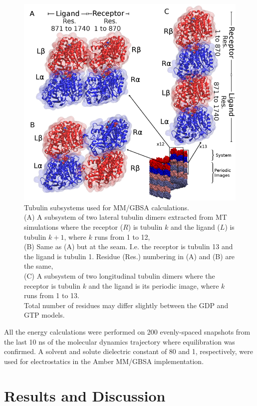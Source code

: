 \documentclass[11pt]{report}
\begin{document}
\begin{figure}[htbp]
	\centering
	\includegraphics[width=0.8\linewidth]{images/Fig3.pdf}
	\caption[Tubulin subsystems used for MM/GBSA Calculations]{{Tubulin subsystems used for MM/GBSA calculations.}
		\\
		(A) A subsystem of two lateral tubulin dimers extracted
		from MT simulations where the receptor ($R$) is tubulin $k$
		and the ligand ($L$) is  tubulin $k+1$, where $k$ runs from 1 to 12,
		\\
		(B) Same as (A) but at the seam. I.e. the receptor is tubulin 13 and the ligand is tubulin 1. Residue (Res.) numbering in (A) and (B) are the same,
		\\
		(C) A subsystem of two longitudinal tubulin dimers where the receptor is
		tubulin $k$ and the ligand is its periodic image, where $k$ runs from 1 to 13.
		\\
		Total number of residues may differ slightly between the GDP and GTP models.}
	\label{fig:TubInt}
\end{figure}

All the energy calculations
were performed on 200 evenly-spaced snapshots from the last 10 ns of the molecular
dynamics trajectory where equilibration was confirmed.
A solvent and solute dielectric constant of 80 and 1, respectively, were used for electrostatics in the
Amber MM/GBSA implementation.

\section{Results and Discussion}
\end{document}
